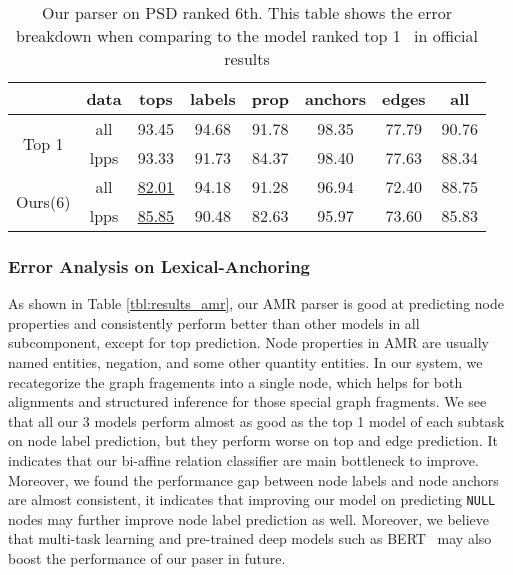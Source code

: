\begin{table}[!h]
\small
\centering
\setlength{\tabcolsep}{2.5pt}
\begin{tabular}{cccccccc}
\toprule
                          & data & tops              & labels & prop  & anchors & edges & all   \\ \hline
\multirow{2}{*}{Top 1}   & all  & 93.45             & 94.68  & 91.78 & 98.35   & 77.79 & 90.76 \\
                          & lpps & 93.33             & 91.73  & 84.37 & 98.40   & 77.63 & 88.34 \\
\multirow{2}{*}{ Ours(6)} & all  & \underline{82.01} & 94.18  & 91.28 & 96.94   & 72.40 & 88.75 \\
                          & lpps & \underline{85.85} & 90.48  & 82.63 & 95.97   & 73.60 & 85.83 \\ \bottomrule
\end{tabular}
\caption{\label{tbl:results_psd} Our parser on PSD ranked 6th. This table shows the error breakdown when comparing to the model ranked top 1~\cite{Don:Fow:Gro:19} in official results}
\end{table}

\subsubsection{Error Analysis on Lexical-Anchoring}
As shown in Table \ref{tbl:results_amr}, our AMR parser is good at
predicting node properties and consistently perform better than other
models in all subcomponent, except for top prediction. Node properties
in AMR are usually named entities, negation, and some other quantity
entities. In our system, we recategorize the graph fragements into a
single node, which helps for both alignments and structured inference
for those special graph fragments. We see that all our 3 models
perform almost as good as the top 1 model of each subtask on node
label prediction, but they perform worse on top and edge
prediction. It indicates that our bi-affine relation classifier are
main bottleneck to improve. Moreover, we found the performance gap
between node labels and node anchors are almost consistent, it
indicates that improving our model on predicting \texttt{NULL} nodes may
further improve node label prediction as well.  Moreover, we believe
that multi-task learning and pre-trained deep models such as
BERT~\cite{devlin2018bert} may also boost the performance of our paser
in future.

